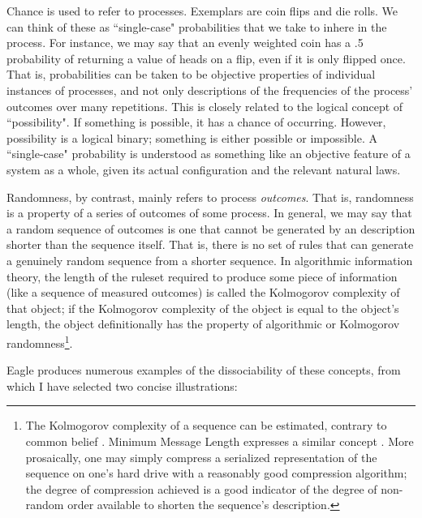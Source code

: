 Chance is used to refer to processes. Exemplars are coin flips and die rolls. We can think of these as ``single-case" probabilities that we take to inhere in the process. For instance, we may say that an evenly weighted coin has a .5 probability of returning a value of heads on a flip, even if it is only flipped once. That is, probabilities can be taken to be objective properties of individual instances of processes, and not only descriptions of the frequencies of the process' outcomes over many repetitions. This is closely related to the logical concept of ``possibility". If something is possible, it has a chance of occurring. However, possibility is a logical binary; something is either possible or impossible. A ``single-case" probability is understood as something like an objective feature of a system as a whole, given its actual configuration and the relevant natural laws.  

Randomness, by contrast, mainly refers to process \textit{outcomes}. That is, randomness is a property of a series of outcomes of some process. In general, we may say that a random sequence of outcomes is one that cannot be generated by an description shorter than the sequence itself. That is, there is no set of rules that can generate a genuinely random sequence from a shorter sequence. In algorithmic information theory, the length of the ruleset required to produce some piece of information (like a sequence of measured outcomes) is called the Kolmogorov complexity of that object; if the Kolmogorov complexity of the object is equal to the object's length, the object definitionally has the property of algorithmic or Kolmogorov randomness\footnote{The Kolmogorov complexity of a sequence can be estimated, contrary to common belief \cite{Li2008}. Minimum Message Length expresses a similar concept \cite{Wallace1999}. More prosaically, one may simply compress a serialized representation of the sequence on one's hard drive with a reasonably good compression algorithm; the degree of compression achieved is a good indicator of the degree of non-random order available to shorten the sequence's description.}.

Eagle produces numerous examples of the dissociability of these concepts, from which I have selected two concise illustrations:

